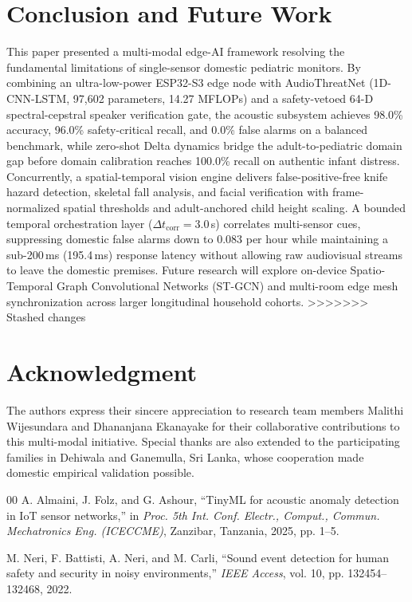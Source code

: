 \documentclass[conference]{IEEEtran}
\begin{document}
\begin{table}[htbp]
\section{Conclusion and Future Work}
This paper presented a multi-modal edge-AI framework resolving the fundamental limitations of single-sensor domestic pediatric monitors. By combining an ultra-low-power ESP32-S3 edge node with AudioThreatNet (1D-CNN-LSTM, 97,602 parameters, 14.27 MFLOPs) and a safety-vetoed 64-D spectral-cepstral speaker verification gate, the acoustic subsystem achieves 98.0\% accuracy, 96.0\% safety-critical recall, and 0.0\% false alarms on a balanced benchmark, while zero-shot Delta dynamics bridge the adult-to-pediatric domain gap before domain calibration reaches 100.0\% recall on authentic infant distress. Concurrently, a spatial-temporal vision engine delivers false-positive-free knife hazard detection, skeletal fall analysis, and facial verification with frame-normalized spatial thresholds and adult-anchored child height scaling. A bounded temporal orchestration layer ($\Delta t_{\text{corr}} = 3.0$\,s) correlates multi-sensor cues, suppressing domestic false alarms down to 0.083 per hour while maintaining a sub-200\,ms (195.4\,ms) response latency without allowing raw audiovisual streams to leave the domestic premises. Future research will explore on-device Spatio-Temporal Graph Convolutional Networks (ST-GCN) \cite{b16} and multi-room edge mesh synchronization across larger longitudinal household cohorts.
>>>>>>> Stashed changes

\section*{Acknowledgment}
The authors express their sincere appreciation to research team members Malithi Wijesundara and Dhananjana Ekanayake for their collaborative contributions to this multi-modal initiative. Special thanks are also extended to the participating families in Dehiwala and Ganemulla, Sri Lanka, whose cooperation made domestic empirical validation possible.

{\small
\begin{thebibliography}{00}
A. Almaini, J. Folz, and G. Ashour, ``TinyML for acoustic anomaly detection in IoT sensor networks,'' in \textit{Proc. 5th Int. Conf. Electr., Comput., Commun. Mechatronics Eng. (ICECCME)}, Zanzibar, Tanzania, 2025, pp. 1--5.

M. Neri, F. Battisti, A. Neri, and M. Carli, ``Sound event detection for human safety and security in noisy environments,'' \textit{IEEE Access}, vol. 10, pp. 132454--132468, 2022.


\end{thebibliography}}
\end{table}
\end{document}

